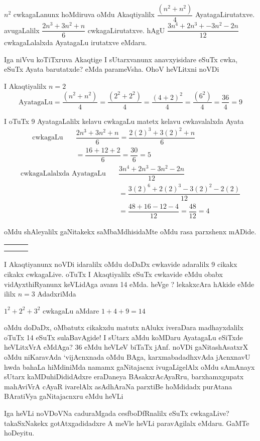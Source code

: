 $n^2$ cwkagaLanunx hoMdiruva oMdu Akaqtiyalilx $\dfrac{(n^2+n^2)}{4}$ AyatagaLirutatxve.
avugaLalilx $\dfrac{2n^3+3n^2+n}{6}$ cwkagaLirutatxve. hAgU     $\dfrac{3n^4+2n^3+-3n^2-2n}{12}$
cwkagaLalalxda AyatagaLu irutatxve eMdaru. 

Iga niVvu koTiTxruva Akaqtige I sUtarxvanunx anavxyisidare eSuTx cwka, eSuTx Ayata barutatxde? eMda parameVsha. OhoV heVLitxni noVDi

I Akaqtiyalilx $n=2$
$$
\text{AyatagaLu} =\dfrac{(n^2+n^2)}{4}=\dfrac{(2^2+2^2)}{4}=\dfrac{(4+2)^2}{4}=\dfrac{(6^2)}{4}=\dfrac{36}{4}=9
$$

I oTuTx {\rm 9} AyatagaLalilx kelavu cwkagaLu matetx kelavu cwkavalalxda Ayata
\begin{align*}
\text{cwkagaLu} \quad &\dfrac{2n^3+3n^2+n}{6}=\dfrac{2(2)^3+3(2)^2+n}{6} \hspace{2cm}\\
& =\dfrac{16+12+2}{6}=\dfrac{30}{6}=5
\end{align*}
\begin{align*}
\text{cwkagaLalalxda AyatagaLu}
 \quad &\dfrac{3n^4+2n^3-3n^2-2n}{12} \hspace{2cm}\\
&=\dfrac{3(2)^6+2(2)^3-3(2)^2-2(2)}{12}\\ 
 &=\dfrac{48+16-12-4}{12}=\dfrac{48}{12}=4
\end{align*}

oMdu shAleyalilx gaNitakekx saMbaMdhisidaMte oMdu rasa parxshenx mADide.
\begin{tabular}{|l|l|l|}
\hline
& & \\
\hline
& & \\
\hline
& & \\
\hline
\end{tabular}
I Akaqtiyanunx noVDi idaralilx oMdu doDaDx cwkavide adaralilx {\rm 9} cikakx cikakx cwkagaLive. oTuTx I Akaqtiyalilx eSuTx cwkavide eMdu obabx vidAyxthiRyanunx keVLidAga avanu {\rm 14} eMda. heVge ? lekakxcAra hAkide eMde ililx $n=3$ AdadxriMda

$1^2+2^2+3^2$ \quad cwkagaLu aMdare \quad $1+4+9=14$

oMdu doDaDx, oMbatutx cikakxdu matutx nAlukx iveraDara madhayxdalilx oTuTx {\rm 14} eSuTx sulaBavAgide! I sUtarx aMdu koMDaru AyatagaLu eSiTxde heVLitxVrA eMdAga? {\rm 36} eMdu heVLeV biTaTx jAnf. noVDi gaNitashAsatxrX oMdu niKaravAda `vijAcnxnada oMdu BAga, karxmabadadhxvAda jAcnxnavU hwda bahaLa hiMdiniMda namamx gaNitajacnx ivugaLigelAlx oMdu sAmAnayx sUtarx kaMDuhiDididAdxre eraDaneya BAsakxrAcAyaRru, barxhamxgupatx mahAviVrA cAyaR ivarelAlx asAdhAraNa parxtiBe hoMdidadx purAtana BAratiVya gaNitajacnxru eMdu heVLi

Iga heVLi noVDoVNa caduraMgada cesfboDfRnalilx eSuTx cwkagaLive? takaSxNakekx gotAtxgadidadxre A meVle heVLi paravAgilalx eMdaru. GaMTe hoDeyitu.
